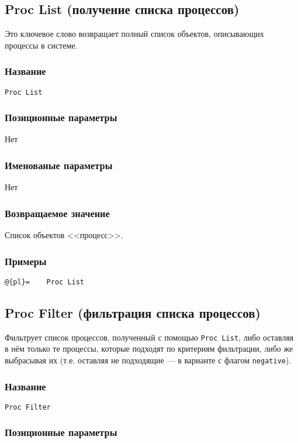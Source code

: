 \documentclass[11pt]{book} %
\begin{document}
\subsection{Proc List (получение списка процессов)}
Это ключевое слово возвращает полный список объектов, описывающих процессы в системе.


\subsubsection*{Название} 
\verb"Proc List"

\subsubsection*{Позиционные параметры} 
Нет

\subsubsection*{Именованые параметры} 
Нет


\subsubsection*{Возвращаемое значение} 
Список объектов <<процесс>>.

\subsubsection*{Примеры}
\begin{verbatim}@{pl}=    Proc List\end{verbatim}



\subsection{Proc Filter (фильтрация списка процессов)}
Фильтрует список процессов, полученный с помощью \verb"Proc List", либо оставляя в нём только те процессы, которые подходят по критериям фильтрации, либо же выбрасывая их (т.е. оставляя не подходящие --- в варианте с флагом \verb"negative").



\subsubsection*{Название} 
\verb"Proc Filter"

\subsubsection*{Позиционные параметры} 
\end{document}
